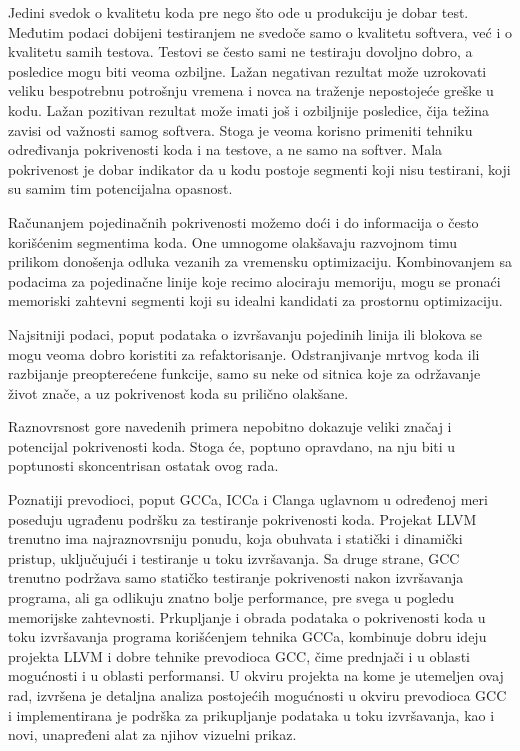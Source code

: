 \documentclass[12pt,oneside]{memoir}
\begin{document}
Jedini svedok o kvalitetu koda pre nego što ode u produkciju je dobar test. Međutim podaci dobijeni testiranjem ne svedoče samo o kvalitetu softvera, već i o kvalitetu samih testova. Testovi se često sami ne testiraju dovoljno dobro, a posledice mogu biti veoma ozbiljne. Lažan negativan rezultat može uzrokovati veliku bespotrebnu potrošnju vremena i novca na traženje nepostojeće greške u kodu. Lažan pozitivan rezultat može imati još i ozbiljnije posledice, čija težina zavisi od važnosti samog softvera. Stoga je veoma korisno primeniti tehniku određivanja pokrivenosti koda i na testove, a ne samo na softver. Mala pokrivenost je dobar indikator da u kodu postoje segmenti koji nisu testirani, koji su samim tim potencijalna opasnost.

 
Računanjem pojedinačnih pokrivenosti možemo doći i do informacija o često korišćenim segmentima koda. One umnogome olakšavaju razvojnom timu prilikom donošenja odluka vezanih za vremensku optimizaciju. Kombinovanjem sa podacima za pojedinačne linije koje recimo alociraju memoriju, mogu se pronaći memoriski zahtevni segmenti koji su idealni kandidati za prostornu optimizaciju. 


Najsitniji podaci, poput podataka o izvršavanju pojedinih linija ili blokova se mogu veoma dobro koristiti za refaktorisanje. Odstranjivanje mrtvog koda ili razbijanje preopterećene funkcije, samo su neke od sitnica koje za održavanje život znače, a uz pokrivenost koda su prilično olakšane. 


Raznovrsnost gore navedenih primera nepobitno dokazuje veliki značaj i potencijal pokrivenosti koda. Stoga će, poptuno opravdano, na nju biti u poptunosti skoncentrisan ostatak ovog rada. 


Poznatiji prevodioci, poput GCCa, ICCa i Clanga uglavnom u određenoj meri poseduju ugrađenu podršku za testiranje pokrivenosti koda. Projekat LLVM trenutno ima najraznovrsniju ponudu, koja obuhvata i statički i dinamički pristup, uključujući i testiranje u toku izvršavanja. Sa druge strane, GCC trenutno podržava samo statičko testiranje pokrivenosti nakon izvršavanja programa, ali ga odlikuju znatno bolje performance, pre svega u pogledu memorijske zahtevnosti. Prkupljanje i obrada podataka o pokrivenosti koda u toku izvršavanja programa korišćenjem tehnika GCCa, kombinuje dobru ideju projekta LLVM i dobre tehnike prevodioca GCC, čime prednjači i u oblasti mogućnosti i u oblasti performansi. U okviru projekta na kome je utemeljen ovaj rad, izvršena je detaljna analiza postojećih mogućnosti u okviru prevodioca GCC i implementirana je podrška za prikupljanje podataka u toku izvršavanja, kao i novi, unapređeni alat za njihov vizuelni prikaz.
\end{document}

